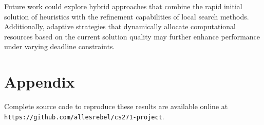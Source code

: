 \documentclass[11pt]{article}
\begin{document}
	Future work could explore hybrid approaches that combine the rapid initial solution of heuristics with the refinement capabilities of local search methods. Additionally, adaptive strategies that dynamically allocate computational resources based on the current solution quality may further enhance performance under varying deadline constraints.
	
	\section{Appendix}
	Complete source code to reproduce these results are available online at\\
	 \texttt{https://github.com/allesrebel/cs271-project}\cite{allesrebel_cs271project}.
	
	
	
	
\end{document}
